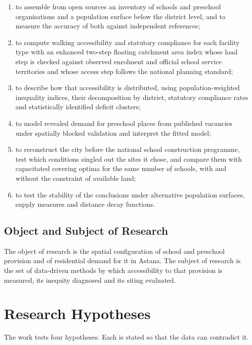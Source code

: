 \begin{enumerate}[nosep]
  \item to assemble from open sources an inventory of schools and preschool organisations and a population surface below the district level, and to measure the accuracy of both against independent references;
  \item to compute walking accessibility and statutory compliance for each facility type with an enhanced two-step floating catchment area index whose load step is checked against observed enrolment and official school service territories and whose access step follows the national planning standard;
  \item to describe how that accessibility is distributed, using population-weighted inequality indices, their decomposition by district, statutory compliance rates and statistically identified deficit clusters;
  \item to model revealed demand for preschool places from published vacancies under spatially blocked validation and interpret the fitted model;
  \item to reconstruct the city before the national school construction programme, test which conditions singled out the sites it chose, and compare them with capacitated covering optima for the same number of schools, with and without the constraint of available land;
  \item to test the stability of the conclusions under alternative population surfaces, supply measures and distance decay functions.
\end{enumerate}

\subsection{Object and Subject of Research}

The object of research is the spatial configuration of school and preschool provision and of residential demand for it in Astana. The subject of research is the set of data-driven methods by which accessibility to that provision is measured, its inequity diagnosed and its siting evaluated.

\section{Research Hypotheses}
\label{sec:hypotheses}

The work tests four hypotheses. Each is stated so that the data can contradict it.

